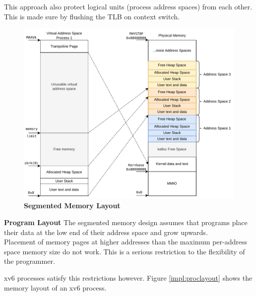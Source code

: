 This approach also protect logical units (process address spaces) from each other. This is made sure
by flushing the TLB on context switch.



\begin{figure}[ht!]
    \centering
    \includegraphics[]{figures/segmented_layout.pdf}
    \caption[Segmented Memory Layout]{\textbf{Segmented Memory Layout}}
    \label{fig:theory:segLayout}
\end{figure}

\textbf{Program Layout} The segmented memory design assumes that programs place their data at the low end of their address
space and grow upwards.\\
Placement of memory pages at higher addresses than the maximum per-address space memory size do not work. This is a serious restriction to the flexibility of the programmer.

xv6 processes satisfy this restrictions however. Figure \ref{impl:proclayout} shows the memory layout
of an xv6 process.

